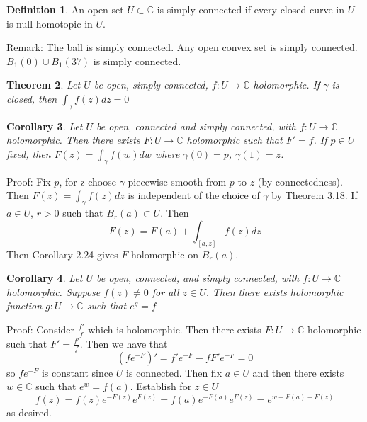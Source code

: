 \documentclass[11pt]{article}
\theoremstyle{plain}
\newtheorem{theorem}{Theorem}[section]
\newtheorem{corollary}[theorem]{Corollary}
\theoremstyle{definition}
\newtheorem{definition}[theorem]{Definition}
\newcommand{\C}{\mathbb{C}}
\begin{document}
\begin{definition}
An open set $U \subset \C$ is simply connected if every closed curve in $U$ is null-homotopic in $U$. 
\end{definition}

Remark: The ball is simply connected. Any open convex set is simply connected. $B_1(0) \cup B_1(37)$ is simply connected. 

\begin{theorem}
Let $U$ be open, simply connected, $f: U \to \C$ holomorphic. If $\gamma$ is closed, then $\int_{\gamma}f(z)dz = 0$
\end{theorem}

\begin{corollary}
Let $U$ be open, connected and simply connected, with $f: U \to \C$ holomorphic. Then there exists $F: U \to \C$ holomorphic such that $F' = f$. If $p \in U$ fixed, then $F(z) = \int_\gamma f(w)dw$ where $\gamma(0) = p$, $\gamma(1) = z$.
\end{corollary}

Proof: Fix $p$, for z choose $\gamma$ piecewise smooth from $p$ to $z$ (by connectedness). Then $F(z) = \int_{\gamma}f(z)dz$ is independent of the choice of $\gamma$ by Theorem 3.18. If $a \in U$, $r > 0$ such that $B_r(a) \subset U$. Then 
$$ F(z) = F(a) + \int_{[a,z]} f(z)dz $$
Then Corollary 2.24 gives $F$ holomorphic on $B_r(a)$. 

\begin{corollary}
Let $U$ be open, connected, and simply connected, with $f: U \to \C$ holomorphic. Suppose $f(z) \neq 0$ for all $z \in U$. Then there exists holomorphic function $g: U \to \C$ such that $e^g = f$
\end{corollary}

Proof: Consider $\frac{f'}{f}$ which is holomorphic. Then there exists $F: U \to \C$ holomorphic such that $F' = \frac{f'}{f}$. Then we have that 
$$ (fe^{-F})' = f'e^{-F} - fF'e^{-F} = 0 $$
so $fe^{-F}$ is constant since $U$ is connected. Then fix $a \in U$ and then there exists $w \in \C$ such that $e^w = f(a)$. Establish for $z \in U$ 
$$ f(z) = f(z)e^{-F(z)}e^{F(z)} = f(a)e^{-F(a)}e^{F(z)} = e^{w - F(a) + F(z)} $$
as desired.
\end{document}
